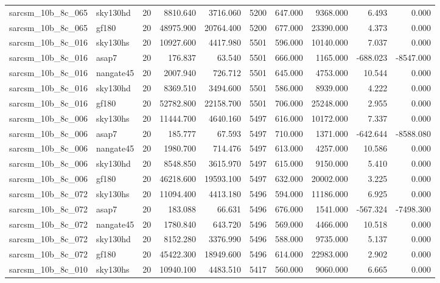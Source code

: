 \begin{tabular}{llrrrrrrrr}
sarcsm\_10b\_8c\_065 & sky130hd & 20 & 8810.640 & 3716.060 & 5200 & 647.000 & 9368.000 & 6.493 & 0.000 \\
sarcsm\_10b\_8c\_065 & gf180 & 20 & 48975.900 & 20764.400 & 5200 & 677.000 & 23390.000 & 4.373 & 0.000 \\
sarcsm\_10b\_8c\_016 & sky130hs & 20 & 10927.600 & 4417.980 & 5501 & 596.000 & 10140.000 & 7.037 & 0.000 \\
sarcsm\_10b\_8c\_016 & asap7 & 20 & 176.837 & 63.540 & 5501 & 666.000 & 1165.000 & -688.023 & -8547.000 \\
sarcsm\_10b\_8c\_016 & nangate45 & 20 & 2007.940 & 726.712 & 5501 & 645.000 & 4753.000 & 10.544 & 0.000 \\
sarcsm\_10b\_8c\_016 & sky130hd & 20 & 8369.510 & 3494.600 & 5501 & 586.000 & 8939.000 & 4.222 & 0.000 \\
sarcsm\_10b\_8c\_016 & gf180 & 20 & 52782.800 & 22158.700 & 5501 & 706.000 & 25248.000 & 2.955 & 0.000 \\
sarcsm\_10b\_8c\_006 & sky130hs & 20 & 11444.700 & 4640.160 & 5497 & 616.000 & 10172.000 & 7.337 & 0.000 \\
sarcsm\_10b\_8c\_006 & asap7 & 20 & 185.777 & 67.593 & 5497 & 710.000 & 1371.000 & -642.644 & -8588.080 \\
sarcsm\_10b\_8c\_006 & nangate45 & 20 & 1980.700 & 714.476 & 5497 & 613.000 & 4257.000 & 10.586 & 0.000 \\
sarcsm\_10b\_8c\_006 & sky130hd & 20 & 8548.850 & 3615.970 & 5497 & 615.000 & 9150.000 & 5.410 & 0.000 \\
sarcsm\_10b\_8c\_006 & gf180 & 20 & 46218.600 & 19593.100 & 5497 & 632.000 & 20002.000 & 3.225 & 0.000 \\
sarcsm\_10b\_8c\_072 & sky130hs & 20 & 11094.400 & 4413.180 & 5496 & 594.000 & 11186.000 & 6.925 & 0.000 \\
sarcsm\_10b\_8c\_072 & asap7 & 20 & 183.088 & 66.631 & 5496 & 676.000 & 1541.000 & -567.324 & -7498.300 \\
sarcsm\_10b\_8c\_072 & nangate45 & 20 & 1780.840 & 643.720 & 5496 & 569.000 & 4466.000 & 10.518 & 0.000 \\
sarcsm\_10b\_8c\_072 & sky130hd & 20 & 8152.280 & 3376.990 & 5496 & 588.000 & 9735.000 & 5.137 & 0.000 \\
sarcsm\_10b\_8c\_072 & gf180 & 20 & 45422.300 & 18949.600 & 5496 & 614.000 & 22983.000 & 2.902 & 0.000 \\
sarcsm\_10b\_8c\_010 & sky130hs & 20 & 10940.100 & 4483.510 & 5417 & 560.000 & 9060.000 & 6.665 & 0.000 \\

\end{tabular}
